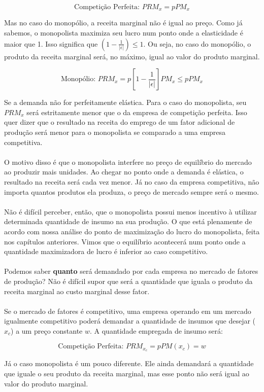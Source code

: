 \documentclass[a4paper,11pt,oneside]{book}
\theoremstyle{definition}
\theoremstyle{break}
\begin{document}
$$ \textrm{Competição Perfeita: } PRM_x = p PM_x $$

Mas no caso do monopólio, a receita marginal não é igual ao preço. Como já sabemos, o monopolista maximiza seu lucro num ponto onde a elasticidade é maior que 1. Isso significa que $\left( 1 - \frac{1}{|\epsilon|} \right) \leq 1 $. Ou seja, no caso do monopólio, o produto da receita marginal será, no máximo, igual ao valor do produto marginal.

$$ \textrm{Monopólio: } PRM_x = p \left[ 1 - \frac{1}{|\epsilon|} \right] PM_x \leq pPM_x $$

Se a demanda não for perfeitamente elástica. Para o caso do monopolista, seu $PRM_x$ será estritamente menor que o da empresa de competição perfeita. Isso quer dizer que o resultado na receita do emprego de um fator adicional de produção será menor para o monopolista se comparado a uma empresa competitiva.
\\~\\
O motivo disso é que o monopolista interfere no preço de equilíbrio do mercado ao produzir mais unidades. Ao chegar no ponto onde a demanda é elástica, o resultado na receita será cada vez menor. Já no caso da empresa competitiva, não importa quantos produtos ela produza, o preço de mercado sempre será o mesmo.
\\~\\
Não é difícil perceber, então, que o monopolista possui menos incentivo à utilizar determinada quantidade de insumo na sua produção. O que está plenamente de acordo com nossa análise do ponto de maximização do lucro do monopolista, feita nos capítulos anteriores. Vimos que o equilíbrio acontecerá num ponto onde a quantidade maximizadora de lucro é inferior ao caso competitivo.
\\~\\
Podemos saber \textbf{quanto} será demandado por cada empresa no mercado de fatores de produção? Não é difícil supor que será a quantidade que iguala o produto da receita marginal ao custo marginal desse fator.
\\~\\
Se o mercado de fatores é competitivo, uma empresa operando em um mercado igualmente competitivo poderá demandar a quantidade de insumos que desejar ($x_c$) a um preço constante $w$. A quantidade empregada de insumo será:

$$ \textrm{Competição Perfeita: } PRM_{x_c} = pPM(x_c) = w $$

Já o caso monopolista é um pouco diferente. Ele ainda demandará a quantidade que iguale o seu produto da receita marginal, mas esse ponto não será igual ao valor do produto marginal.
\end{document}
